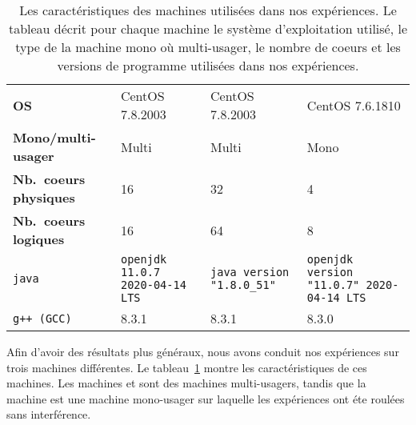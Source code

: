 %
%
%
%
%
%
%

\newcommand{\LARGEUR}{3cm}

\begin{table}
\begin{tabular}{|p{3cm}|p{\LARGEUR}|p{\LARGEUR}|p{\LARGEUR}|}
\hline
  & \M1 & \M2 & \M3
\\\hline
\textbf{OS} & CentOS 7.8.2003 & CentOS 7.8.2003 & CentOS 7.6.1810
\\\hline
\textbf{Mono/multi-usager} & Multi & Multi & Mono
\\\hline
\textbf{Nb.~coeurs physiques} & 16 & 32 & 4
\\\hline
\textbf{Nb.~coeurs logiques} & 16 & 64 & 8
\\\hline
\texttt{java}
  & \texttt{openjdk 11.0.7 2020-04-14 LTS}
  & \texttt{java version "1.8.0\_51"}
  & \texttt{openjdk version "11.0.7" 2020-04-14 LTS}
\\\hline
\texttt{g++ (GCC)}
   & 8.3.1
   & 8.3.1 
   & 8.3.0
\\\hline
\end{tabular}
\caption{Les caract\'eristiques des machines utilis\'ees dans nos exp\'eriences. Le tableau d\'ecrit pour chaque machine le syst\`eme d'exploitation utilis\'e, le type de la machine mono o\`u multi-usager, le nombre de coeurs et les versions de programme utilis\'ees dans nos exp\'eriences.}
\label{machines.table}
\end{table}


Afin d'avoir des r\'esultats plus g\'en\'eraux, nous avons conduit nos exp\'eriences sur trois machines diff\'erentes. Le tableau~\ref{machines.table} montre les caract\'eristiques de ces machines. Les machines  et  sont des machines multi-usagers, tandis que la machine  est une machine mono-usager sur laquelle les exp\'eriences ont \'et\/e roul\'ees sans interf\'erence.

